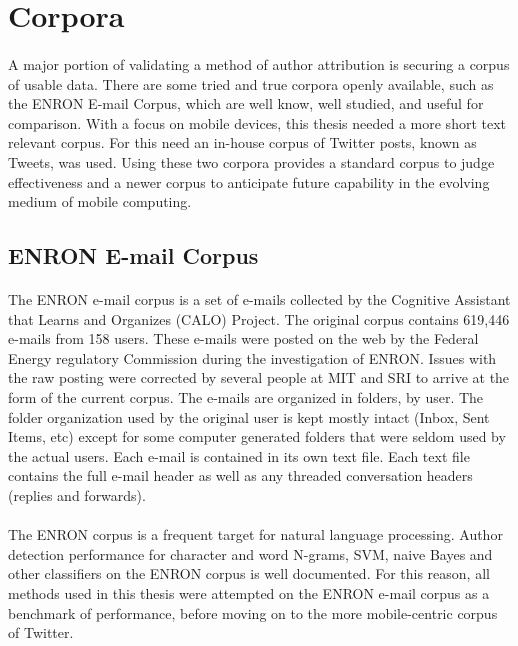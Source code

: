 \section{Corpora}
	\paragraph{}A major portion of validating a method of author attribution is securing a corpus of usable data.  There are some tried and true corpora openly available, such as the ENRON E-mail Corpus, which are well know, well studied, and useful for comparison.  With a focus on mobile devices, this thesis needed a more short text relevant corpus.  For this need an in-house corpus of Twitter posts, known as Tweets, was used.  Using these two corpora provides a standard corpus to judge effectiveness and a newer corpus to anticipate future capability in the evolving medium of mobile computing.
	\subsection{ENRON E-mail Corpus}
		\paragraph{} The ENRON e-mail corpus is a set of e-mails collected by the Cognitive Assistant that Learns and Organizes (CALO) Project.  The original corpus contains 619,446 e-mails from 158 users.  These e-mails were posted on the web by the Federal Energy regulatory Commission during the investigation of ENRON.  Issues with the raw posting were corrected by several people at MIT and SRI to arrive at the form of the current corpus.  The e-mails are organized in folders, by user.  The folder organization used by the original user is kept mostly intact (Inbox, Sent Items, etc) except for some computer generated folders that were seldom used by the actual users.  Each e-mail is contained in its own text file.  Each text file contains the full e-mail header as well as any threaded conversation headers (replies and forwards).\cite{_enron_????}
		\paragraph{} The ENRON corpus is a frequent target for natural language processing.  Author detection performance for character and word N-grams, SVM, naive Bayes and other classifiers on the ENRON corpus is well documented. For this reason, all methods used in this thesis were attempted on the ENRON e-mail corpus as a benchmark of performance, before moving on to the more mobile-centric corpus of Twitter.

